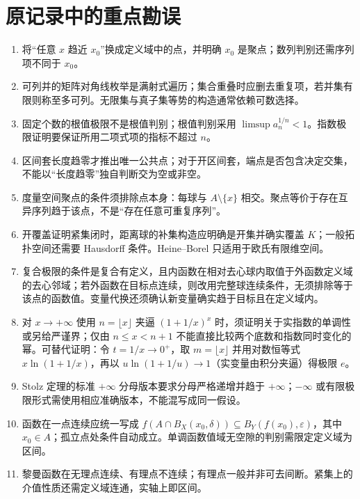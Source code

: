 \documentclass[11pt,a4paper,UTF8]{ctexart}
\theoremstyle{definition}\newtheorem{definition}[theorem]{定义}
\theoremstyle{remark}\newtheorem{remark}[theorem]{说明}
\begin{document}
\section{原记录中的重点勘误}
\begin{enumerate}
\item 将“任意 $x$ 趋近 $x_0$”换成定义域中的点，并明确 $x_0$ 是聚点；数列判别还需序列项不同于 $x_0$。
\item 可列并的矩阵对角线枚举是满射式遍历；集合重叠时应删去重复项，若并集有限则称至多可列。无限集与真子集等势的构造通常依赖可数选择。
\item 固定个数的根值极限不是根值判别；根值判别采用 $\limsup a_n^{1/n}<1$。指数极限证明要保证所用二项式项的指标不超过 $n$。
\item 区间套长度趋零才推出唯一公共点；对于开区间套，端点是否包含决定交集，不能以“长度趋零”独自判断交为空或非空。
\item 度量空间聚点的条件须排除点本身：每球与 $A\setminus\{x\}$ 相交。聚点等价于存在互异序列趋于该点，不是“存在任意可重复序列”。
\item 开覆盖证明紧集闭时，距离球的补集构造应明确是开集并确实覆盖 $K$；一般拓扑空间还需要 Hausdorff 条件。Heine--Borel 只适用于欧氏有限维空间。
\item 复合极限的条件是复合有定义，且内函数在相对去心球内取值于外函数定义域的去心邻域；若外函数在目标点连续，则改用完整球连续条件，无须排除等于该点的函数值。变量代换还须确认新变量确实趋于目标且在定义域内。
\item 对 $x\to+\infty$ 使用 $n=\lfloor x\rfloor$ 夹逼 $(1+1/x)^x$ 时，须证明关于实指数的单调性或另给严谨界；仅由 $n\le x<n+1$ 不能直接比较两个底数和指数同时变化的幂。可替代证明：令 $t=1/x\to0^+$，取 $m=\lfloor x\rfloor$ 并用对数恒等式 $x\ln(1+1/x)$，再以 $u\ln(1+1/u)\to1$（实变量由积分夹逼）得极限 $e$。
\item Stolz 定理的标准 $+\infty$ 分母版本要求分母严格递增并趋于 $+\infty$；$-\infty$ 或有限极限形式需使用相应准确版本，不能混写成同一假设。
\item 函数在一点连续应统一写成 $f(A\cap B_X(x_0,\delta))\subseteq B_Y(f(x_0),\varepsilon)$，其中 $x_0\in A$；孤立点处条件自动成立。单调函数值域无空隙的判别需限定定义域为区间。
\item 黎曼函数在无理点连续、有理点不连续；有理点一般并非可去间断。紧集上的介值性质还需定义域连通，实轴上即区间。
\end{enumerate}
\end{document}
